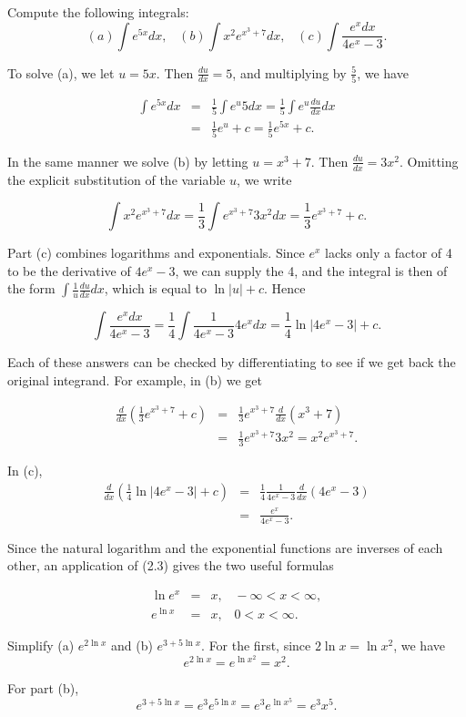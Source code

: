 \begin{example} Compute the following integrals:
$$
(a) \int e^{5x} dx, \;\;\; (b) \int x^{2} e^{x^{3} +7} dx,\;\;\; (c) \int \frac{e^{x} dx}{4e^{x} - 3}. 
$$

\noindent To solve (a), we let $u = 5x$. Then $\frac{du}{dx} = 5$, and multiplying by $\frac{5}{5}$, we have 

\begin{eqnarray*}
\int e^{5x} dx &=& \frac{1}{5} \int e^{u} 5 dx = \frac{1}{5} \int e^{u} \frac{du}{dx} dx\\
               &=& \frac{1}{5} e^{u} + c = \frac{1}{5}e^{5x} + c.
\end{eqnarray*}

\noindent In the same manner we solve (b) by letting $u = x^3 + 7$. Then $\frac{du}{dx} = 3x^2$. Omitting the explicit substitution of the variable $u$, we write

$$
\int x^{2} e^{x^{3} +7} dx = \frac{1}{3} \int e^{x^{3}+7} 3x^{2} dx = \frac{1}{3} e^{x^{3}+7} + c.
$$

\noindent Part (c) combines logarithms and exponentials. Since $e^{x}$ lacks only a factor of 4 to be the derivative of $4e^{x} - 3$, we can supply the 4, and the integral is
then of the form $\int \frac{1}{u} \frac{du}{dx} dx$, which is equal to $\ln |u| + c$. Hence

$$
\int \frac{e^{x} dx}{4e^{x} - 3} = \frac{1}{4} \int \frac{1}{4e^{x} -3} 4e^{x} dx = \frac{1}{4} \ln |4e^{x}-3| + c.
$$

\noindent Each of these answers can be checked by differentiating to see if we get back the original integrand. For example, in (b) we get

\begin{eqnarray*}
\frac{d}{dx} (\frac{1}{3}e^{x^{3}+7} + c) 
&=& \frac{1}{3}e^{x^{3} + 7} \frac{d}{dx} (x^3 + 7)\\
&=& \frac{1}{3}e^{x^{3} +7} 3x^2 = x^{2} e^{x^{3}+7}.
\end{eqnarray*}

\noindent In (c), 
\begin{eqnarray*}
\frac{d}{dx} (\frac{1}{4} \ln |4e^{x} - 3| + c) 
&=& \frac{1}{4} \frac{1}{4e^{x} - 3} \frac{d}{dx} (4e^{x} - 3)\\
&=& \frac{e^{x}}{4e^{x} - 3}.
\end{eqnarray*}

Since the natural logarithm and the exponential functions are inverses of each other, an application of (2.3) gives the two useful formulas

\begin{eqnarray*}
  \ln e^x &=& x, \;\;\; -\infty < x < \infty,\\
e^{\ln x} &=& x, \;\;\; 0< x< \infty.
\end{eqnarray*}
\end{example}
\medskip

\begin{example}
Simplify (a) $e^{2 \ln x}$ and (b) $e^{3 + 5 \ln x}$. For the first, since $2 \ln x = \ln x^2$,  we have
$$
e^{2 \ln x} = e^{\ln x^2} = x^2.
$$

\noindent For part (b),
$$
 e^{3+ 5 \ln x} = e^{3} e^{5 \ln x} = e^{3} e^{\ln x^5} = e^{3}x^{5}.
$$
\end{example}
